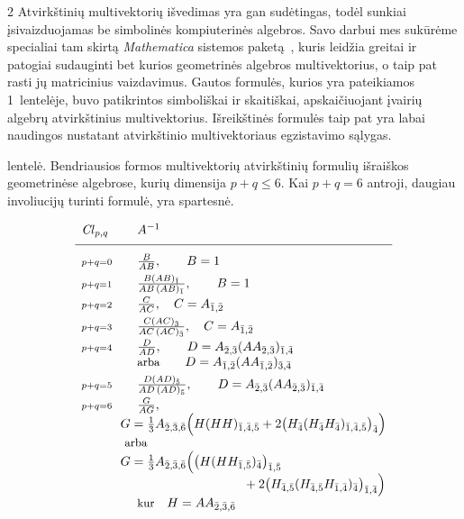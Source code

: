 \documentclass[a4paper,10pt,lithuanian]{article}
\newcommand{\cl}[2]{\ensuremath{\mathit{Cl}_{#1,#2}}} %
\begin{document}
\begin{multicols*}{2}
Atvirkštinių multivektorių išvedimas yra gan sudėtingas,
todėl sunkiai įsivaizduojamas be simbolinės kompiuterinės
algebros. Savo darbui mes sukūrėme specialiai tam skirtą {\it
Mathematica} sistemos paketą~\cite{key-4}, kuris leidžia greitai
ir patogiai sudauginti bet kurios geometrinės algebros
multivektorius, o taip pat rasti jų matricinius vaizdavimus.
Gautos formulės, kurios yra pateikiamos 1~lentelėje, buvo patikrintos simboliškai ir skaitiškai, apskaičiuojant įvairių algebrų atvirkštinius multivektorius. Išreikštinės formulės taip pat yra labai naudingos nustatant atvirkštinio multivektoriaus egzistavimo sąlygas.

\vspace{10pt}  lentelė. {\footnotesize Bendriausios
formos  multivektorių atvirkštinių formulių išraiškos geometrinėse
algebrose, kurių dimensija $p+q\le 6$. Kai $p+q=6$ antroji,
daugiau involiucijų turinti formulė, yra spartesnė.}
\begin{center}
\[\begin{array}{ll}
\cl{p}{q}&\quad  A^{-1} \\[5pt]\hline\\[-5pt]
\scriptstyle p+q=0&\quad\frac{B}{AB},\qquad B=1\\[4pt]
%
\scriptstyle p+q=1&\quad
\frac{B(AB)_{\bar{1}}}{AB\,(AB)_{\bar{1}}},\qquad B=1\\[4pt]
%
\scriptstyle  p+q=2&\quad \frac{C}{AC}
,\quad C=A_{\bar{1},\bar{2}}\\[4pt]
%
\scriptstyle p+q=3 &\quad
 \frac{C(AC)_{\bar{3}}}{AC\,(AC)_{\bar{3}}}
,\quad C=A_{\bar{1},\bar{2}}\\[4pt]
%
\scriptstyle p+q=4&\quad\frac{D}{AD},\qquad
D=A_{\bar{2},\bar{3}}
(AA_{\bar{2},\bar{3}})_{\bar{1},\bar{4}}\quad \\
   &\quad\textrm{\small arba}\qquad D=A_{\bar{1},\bar{2}}(A
A_{\bar{1},\bar{2}})_{\bar{3},\bar{4}}  \\[4pt]
%
\scriptstyle p+q=5&\quad\frac{D(AD)_{\bar{5}}}{AD\,
(AD)_{\bar{5}}},\qquad
D=A_{\bar{2},\bar{3}}
(AA_{\bar{2},\bar{3}})_{\bar{1},\bar{4}}\\[4pt]
%
\scriptstyle p+q=6&\quad\frac{G}{AG},\\
&
\!\!G=\frac{1}{3} A_{\bar{2},\bar{3},\bar{6}} \Bigl(H (H H)_{\bar{1},\bar{4},\bar{5}} + 2 \bigl(H_{\bar{4}} (H_{\bar{4}} H_{\bar{4}})_{\bar{1},\bar{4},\bar{5}}\bigr)_{\bar{4}}\Bigr)\\
&\textrm{\small arba}\\
&\!\!G=\frac{1}{3} A_{\bar{2},\bar{3},\bar{6}} \Bigl(\bigl(H (H H_{\bar{1},\bar{5}})_{\bar{4}}\bigr)_{\bar{1},\bar{5}}\\
&\hphantom{G=\frac{1}{3} A_{\bar{2},\bar{3},\bar{6}} \Bigl(\bigl(H (H H}
+ 2 \bigl(H_{\bar{4},\bar{5}} (H_{\bar{4},\bar{5}} H_{\bar{1},\bar{4}})_{\bar{4}}\bigr)_{\bar{1},\bar{4}}\Bigr)\\
&\quad\textrm{\small kur}\quad H=A A_{\bar{2},\bar{3},\bar{6}}
\end{array}
\]
\end{center}



\end{multicols*}
\end{document}
